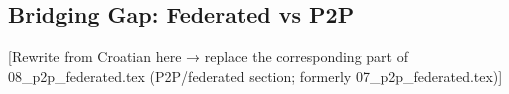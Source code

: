 %
%
%
%
%

\subsection{Bridging Gap: Federated vs P2P}
\label{sec:p2p:gap_reframe}

[Rewrite from Croatian here → replace the corresponding part of 08_p2p_federated.tex (P2P/federated section; formerly 07_p2p_federated.tex)]

